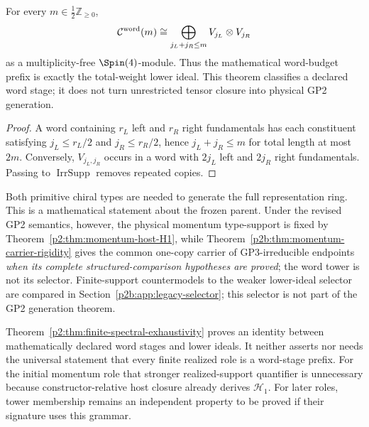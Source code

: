 \documentclass[11pt,a4paper]{article}
\begin{document}
\begin{theorem}
\label{p2:thm:finite-spectral-exhaustivity}
For every \(m\in\frac12\mathbb Z_{\ge0}\),
\[
 \mathcal C^{\rm word}(m)
 \cong
 \bigoplus_{j_L+j_R\le m}V_{j_L}\otimes V_{j_R}
\]
as a multiplicity-free \(\Spin(4)\)-module.  Thus the mathematical
word-budget prefix is exactly the total-weight lower ideal.  This theorem
classifies a declared word stage; it does not turn unrestricted tensor closure
into physical GP2 generation.
\end{theorem}

\begin{proof}
A word containing \(r_L\) left and \(r_R\) right fundamentals has each
constituent satisfying \(j_L\le r_L/2\) and \(j_R\le r_R/2\), hence
\(j_L+j_R\le m\) for total length at most \(2m\).  Conversely,
\(V_{j_L,j_R}\) occurs in a word with \(2j_L\) left and \(2j_R\) right
fundamentals.  Passing to \(\operatorname{IrrSupp}\) removes repeated copies.
\end{proof}

\begin{remark}
\label{p2:rem:spex-seed-sharp}
Both primitive chiral types are needed to generate the full representation
ring.  This is a mathematical statement about the frozen parent.  Under the
revised GP2 semantics, however, the physical momentum type-support is fixed by
Theorem~\ref{p2:thm:momentum-host-H1}, while
Theorem~\ref{p2b:thm:momentum-carrier-rigidity} gives the common
one-copy carrier of GP3-irreducible endpoints \emph{when its complete
structured-comparison hypotheses are proved}; the word tower is not
its selector.
Finite-support countermodels to the weaker lower-ideal selector are
compared in Section~\ref{p2b:app:legacy-selector}; this selector is
not part of the GP2 generation theorem.
\end{remark}

\begin{corollary}
\label{p2:cor:psli-discharged}
Theorem~\ref{p2:thm:finite-spectral-exhaustivity} proves an identity between
mathematically declared word stages and lower ideals.  It neither asserts nor
needs the universal statement that every finite realized role is a word-stage
prefix.  For the initial momentum role that stronger realized-support
quantifier is unnecessary because constructor-relative host closure already
derives \(\mathcal H_1\).  For later roles, tower membership remains an
independent property to be proved if their signature uses this grammar.
\end{corollary}
\end{document}
